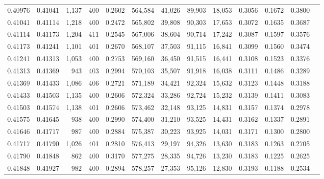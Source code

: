 \begin{tabular}{rrrrrrrrrrrrr}
0.40976 & 0.41041 &  1,137 & 400 &                                     0.2602 & 564,584 &  41,026 &  89,903 &  18,053 & 0.3056 & 0.1672 & 0.3800 \\
0.41041 & 0.41114 &  1,218 & 400 &                                     0.2472 & 565,802 &  39,808 &  90,303 &  17,653 & 0.3072 & 0.1635 & 0.3687 \\
0.41114 & 0.41173 &  1,204 & 411 &                                     0.2545 & 567,006 &  38,604 &  90,714 &  17,242 & 0.3087 & 0.1597 & 0.3576 \\
0.41173 & 0.41241 &  1,101 & 401 &                                     0.2670 & 568,107 &  37,503 &  91,115 &  16,841 & 0.3099 & 0.1560 & 0.3474 \\
0.41241 & 0.41313 &  1,053 & 400 &                                     0.2753 & 569,160 &  36,450 &  91,515 &  16,441 & 0.3108 & 0.1523 & 0.3376 \\
0.41313 & 0.41369 &    943 & 403 &                                     0.2994 & 570,103 &  35,507 &  91,918 &  16,038 & 0.3111 & 0.1486 & 0.3289 \\
0.41369 & 0.41433 &  1,086 & 406 &                                     0.2721 & 571,189 &  34,421 &  92,324 &  15,632 & 0.3123 & 0.1448 & 0.3188 \\
0.41433 & 0.41503 &  1,135 & 400 &                                     0.2606 & 572,324 &  33,286 &  92,724 &  15,232 & 0.3139 & 0.1411 & 0.3083 \\
0.41503 & 0.41574 &  1,138 & 401 &                                     0.2606 & 573,462 &  32,148 &  93,125 &  14,831 & 0.3157 & 0.1374 & 0.2978 \\
0.41575 & 0.41645 &    938 & 400 &                                     0.2990 & 574,400 &  31,210 &  93,525 &  14,431 & 0.3162 & 0.1337 & 0.2891 \\
0.41646 & 0.41717 &    987 & 400 &                                     0.2884 & 575,387 &  30,223 &  93,925 &  14,031 & 0.3171 & 0.1300 & 0.2800 \\
0.41717 & 0.41790 &  1,026 & 401 &                                     0.2810 & 576,413 &  29,197 &  94,326 &  13,630 & 0.3183 & 0.1263 & 0.2705 \\
0.41790 & 0.41848 &    862 & 400 &                                     0.3170 & 577,275 &  28,335 &  94,726 &  13,230 & 0.3183 & 0.1225 & 0.2625 \\
0.41848 & 0.41927 &    982 & 400 &                                     0.2894 & 578,257 &  27,353 &  95,126 &  12,830 & 0.3193 & 0.1188 & 0.2534 \\

\end{tabular}
